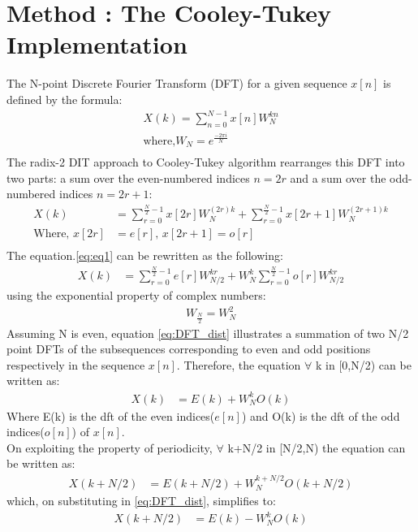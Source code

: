 \documentclass[journal,12pt,twocolumn]{IEEEtran}
\begin{document}
\section{Method : The Cooley-Tukey Implementation}
The N-point Discrete Fourier Transform (DFT) for a given sequence $x[n]$ is defined by the formula:
\begin{align}
X(k) = \sum_{n=0}^{N-1}x[n]W_{N}^{kn} \label{eq:DFT_equation}\\
\text{where,} W_N = e^\frac{-2\pi i}{N}\\
\end{align}
The radix-2 DIT approach to Cooley-Tukey algorithm rearranges this DFT into two parts: a sum over the even-numbered indices $n=2r$ and a sum over the odd-numbered indices $n=2r+1$:
\begin{align}
X(k) &= \sum_{r=0}^{\frac{N}{2}-1}x[2r]W_{N}^{(2r)k} + \sum_{r=0}^{\frac{N}{2}-1}x[2r+1]W_{N}^{(2r+1)k} \label{eq:eq1}\\
\text{Where, }    x[2r]&=e[r] \text{, }x[2r+1]=o[r]\\
\end{align}
The equation.\ref{eq:eq1} can be rewritten as the following:
\begin{align}
    X(k) &= \sum_{r=0}^{\frac{N}{2}-1}e[r]W_{N/2}^{kr} + W_{N}^k\sum_{r=0}^{\frac{N}{2}-1}o[r]W_{N/2}^{kr}
    \label{eq:DFT_dist}
\end{align}
using the exponential property of complex numbers:
\begin{align}
    W_\frac{N}{2} = W_{N}^{2}
\end{align}
Assuming N is even, equation \eqref{eq:DFT_dist} illustrates a summation of two N/2 point DFTs of the subsequences corresponding to even and odd positions respectively in the sequence $x[n]$.
Therefore, the equation $\forall$ k in [0,N/2) can be written as:
\begin{align}
    X(k) &= E(k) + W_{N}^k O(k)  \label{eq:eq2}
\end{align}
Where E(k) is the dft of the even indices($e[n]$) and O(k) is the dft of the odd indices($o[n]$) of $x[n]$.\\
On exploiting the property of periodicity,
$\forall$ k+N/2 in [N/2,N) the equation can be written as:
\begin{align}
    X(k+N/2) &= E(k+N/2) + W_{N}^{k+N/2} O(k+N/2)
\end{align}
which, on substituting in \eqref{eq:DFT_dist}, simplifies to:
\begin{align}
    X(k+N/2) &= E(k) - W_N^k O(k) \label{eq:eq3}
\end{align}
\end{document}
